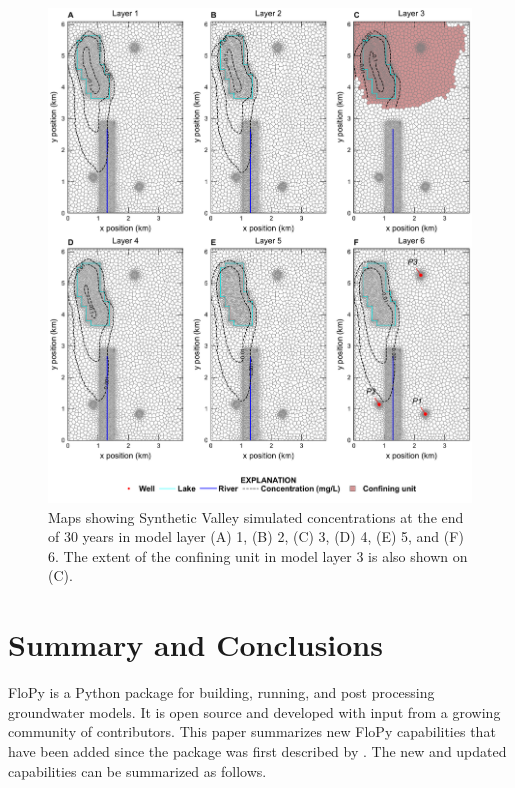 \documentclass[12pt, oneside]{article}  	%
\begin{document}
\begin{figure}[ht!]
	\begin{center}
		\includegraphics{figure8.pdf}
	\end{center}
	\caption{Maps showing Synthetic Valley simulated concentrations at the end of 30 years in model layer (A) 1, (B) 2, (C) 3, (D) 4, (E) 5, and (F) 6. The extent of the confining unit in model layer 3 is also shown on (C).}
	\label{fig:mvconc}
\end{figure}

\section*{Summary and Conclusions} \label{sec:summary}
FloPy is a Python package for building, running, and post processing groundwater models. It is open source and developed with input from a growing community of contributors. This paper summarizes new FloPy capabilities that have been added since the package was first described by \cite{bakker2016scripting}. The new and updated capabilities can be summarized as follows.
\end{document}

